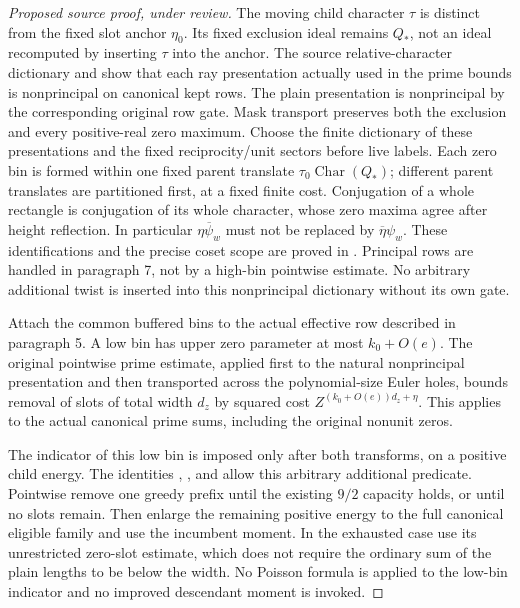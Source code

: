 \begin{proof}[Proposed source proof, under review]
The moving child character $\tau$ is distinct from the fixed slot
anchor $\eta_0$. Its fixed exclusion ideal remains $Q_*$, not an
ideal recomputed by inserting $\tau$ into the anchor. The source
relative-character dictionary and 
show that each ray presentation actually used in the prime bounds
is nonprincipal on canonical kept rows. The plain presentation is
nonprincipal by the corresponding original row gate. Mask transport
preserves both the exclusion and every positive-real zero maximum.
Choose the finite dictionary of these presentations and the fixed
reciprocity/unit sectors before live labels. Each zero bin is formed
within one fixed parent translate $\tau_0\operatorname{Char}(Q_*)$;
different parent translates are partitioned first, at a fixed finite
cost. Conjugation of a whole rectangle is conjugation of its whole
character, whose zero maxima agree after height reflection. In
particular $\overline{\eta\psi_w}$ must not be replaced by
$\overline\eta\psi_w$. These identifications and the precise coset
scope are proved in .
Principal rows are handled in paragraph 7, not by a high-bin
pointwise estimate. No arbitrary additional twist is inserted into
this nonprincipal dictionary without its own gate.

Attach the common buffered bins to the actual effective row described
in paragraph 5. A low bin has upper zero parameter at most
$k_0+O(e)$. The original pointwise prime estimate, applied first to
the natural nonprincipal presentation and then transported across
the polynomial-size Euler holes, bounds removal of slots of total
width $d_z$ by squared cost
$Z^{(k_0+O(e))d_z+\eta}$. This applies to the actual canonical prime
sums, including the original nonunit zeros.

The indicator of this low bin is imposed only after both transforms,
on a positive child energy. The identities
,
, and
allow this arbitrary additional  predicate.
Pointwise remove one greedy prefix until the existing $9/2$ capacity
holds, or until no slots remain. Then enlarge the remaining positive
energy to the full canonical eligible family and use the incumbent
moment. In the exhausted case use its unrestricted zero-slot
estimate, which does not require the ordinary sum of the plain
lengths to be below the width. No Poisson formula is applied to the
low-bin indicator and no improved descendant moment is invoked.


\end{proof}
